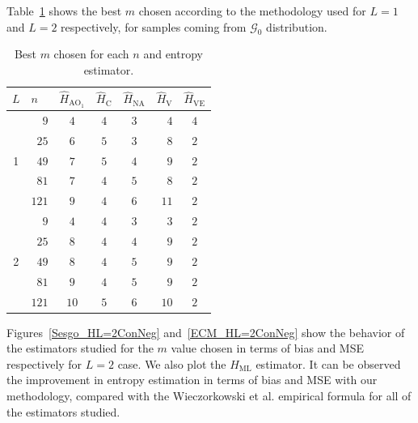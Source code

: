 \documentclass[journal]{IEEEtran}
\begin{document}
Table~\ref{tab:Mejor_m} shows the best $m$ chosen according to the methodology used for $L=1$ and $L=2$ respectively, for samples coming from $\mathcal{G}_0$ distribution. 

\begin{table}[htbp]
	\label{tab:Mejor_m}
	\centering
	\caption{Best $m$ chosen for each $n$ and entropy estimator.}
	\begin{tabular}{crcccrc}
		\toprule
		$L$     & \multicolumn{1}{l}{$n$} & \multicolumn{1}{l}{$\widehat{H}_{{\text{AO}}_1}$} & \multicolumn{1}{l}{$\widehat{H}_\text{C}$} & \multicolumn{1}{l}{$\widehat{H}_{\text{NA}}$} & \multicolumn{1}{l}{$\widehat{H}_\text{V}$} & \multicolumn{1}{l}{$\widehat{H}_{\text{VE}}$} \\
		\midrule
		\multirow{5}[1]{*}{1} 
		& $9$     & $4$     & $4$     & $3$     & $4$     & $4$ \\
		& $25$    & $6$     & $5$     & $3$     & $8$     & $2$ \\
		& $49$    & $7$     & $5$     & $4$     & $9$     & $2$ \\
		& $81$    & $7$     & $4$     & $5$     & $8$     & $2$ \\
		& $121$   & $9$     & $4$     & $6$     & $11$    & $2$ \\
		\midrule
		\multirow{5}[0]{*}{2} 
		& $9$     & $4$     & $4$     & $3$     & $3$     & $2$ \\
		& $25$    & $8$     & $4$     & $4$     & $9$     & $2$ \\
		& $49$    & $8$     & $4$     & $5$     & $9$     & $2$ \\
		& $81$    & $9$     & $4$     & $5$     & $9$     & $2$ \\
		& $121$   & $10$    & $5$     & $6$     & $10$    & $2$ \\
		\bottomrule
	\end{tabular}
\end{table}


Figures~\ref{Sesgo_HL=2ConNeg} and~\ref{ECM_HL=2ConNeg} show the behavior of the estimators studied for the $m$ value chosen in terms of bias and MSE respectively for $L=2$ case. We also plot the $H_{\text{ML}}$ estimator. It can be observed the improvement in entropy estimation in terms of bias and MSE with our methodology, compared with the Wieczorkowski et al. empirical formula for all of the estimators studied.
\end{document}
